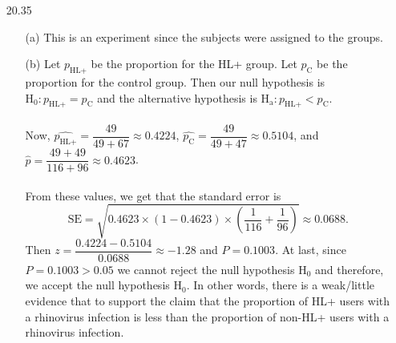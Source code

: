 \documentclass[11pt, a4paper]{article}
\begin{document}
\begin{itemize}
\item[]
\item[]

\item[20.35]
\begin{itemize}
\item[(a)]
This is an experiment since the subjects were assigned to the groups.

\item[]

\item[(b)]
Let $p_\text{HL+}$ be the proportion for the HL+ group.
Let $p_\text{C}$ be the proportion for the control group.
Then our null hypothesis is $\text{H}_0: p_\text{HL+} = p_\text{C}$ and the alternative
hypothesis is $\text{H}_\text{a}: p_\text{HL+} < p_\text{C}$.\\\\
Now, $\hat{p_\text{HL+}} = \dfrac{49}{49 + 67} \approx 0.4224$, $\hat{p_\text{C}} = \dfrac{49}{49 + 47} \approx 0.5104$, and $\hat{p} = \dfrac{49 + 49}{116 + 96} \approx 0.4623$.\\\\
From these values, we get that the standard error is
$$\text{SE} = \sqrt{0.4623 \times (1 - 0.4623) \times (\dfrac{1}{116} + \dfrac{1}{96})} \approx 0.0688.$$
Then $z = \dfrac{0.4224 - 0.5104}{0.0688} \approx -1.28$ and $P = 0.1003$.
At last, since $P = 0.1003 > 0.05$ we cannot reject the null hypothesis $\text{H}_0$
and therefore, we accept the null hypothesis $\text{H}_0$. In other words, there
is a weak/little evidence that to support the claim that the proportion of HL+ users
with a rhinovirus infection is less than the proportion of non-HL+ users with a rhinovirus infection.
\end{itemize}

\end{itemize}
\end{document}
